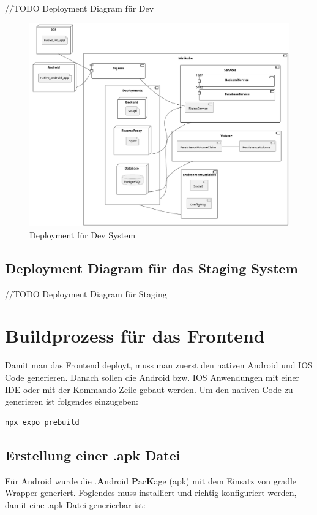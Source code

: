 //TODO Deployment Diagram für Dev
\begin{figure}
  \centering
  \includegraphics[width=\textwidth]{./pics/dev-deployment.png}
  \caption{Deployment für Dev System}

\end{figure}

\subsection{Deployment Diagram für das Staging System}


//TODO Deployment Diagram für Staging

\section{Buildprozess für das Frontend}

Damit man das Frontend deployt, muss man zuerst den nativen Android und IOS Code generieren.
Danach sollen die Android bzw. IOS Anwendungen mit einer IDE oder mit der Kommando-Zeile gebaut werden.
Um den nativen Code zu generieren ist folgendes einzugeben:
\begin{lstlisting}[language=Bash,caption=generate android and ios]
npx expo prebuild
\end{lstlisting}



\subsection{Erstellung einer .apk Datei}
Für Android wurde die .\textbf{A}ndroid \textbf{P}ac\textbf{K}age (apk)  mit dem Einsatz von gradle Wrapper generiert.
Foglendes muss installiert und richtig konfiguriert werden, damit  eine .apk Datei generierbar ist:



